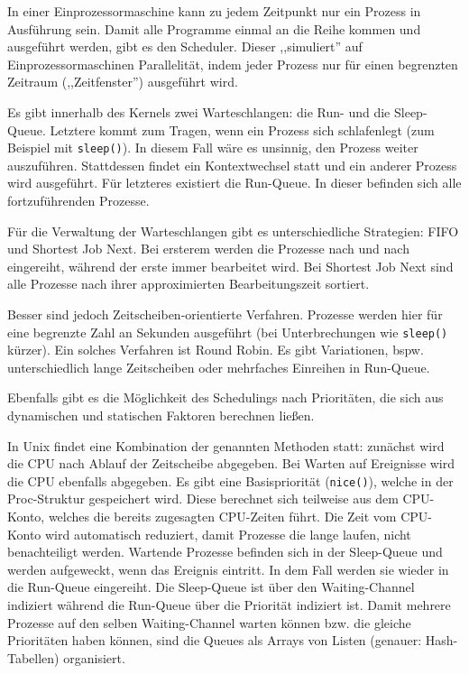 \begin{answer}
  In einer Einprozessormaschine kann zu jedem Zeitpunkt nur ein Prozess in Ausführung sein.
  Damit alle Programme einmal an die Reihe kommen und ausgeführt werden, gibt es den Scheduler.
  Dieser ,,simuliert'' auf Einprozessormaschinen Parallelität, indem jeder Prozess nur für
  einen begrenzten Zeitraum (,,Zeitfenster'') ausgeführt wird.

  Es gibt innerhalb des Kernels zwei Warteschlangen: die Run- und die Sleep-Queue.
  Letztere kommt zum Tragen, wenn ein Prozess sich schlafenlegt (zum Beispiel mit \texttt{sleep()}).
  In diesem Fall wäre es unsinnig, den Prozess weiter auszuführen. Stattdessen findet ein Kontextwechsel
  statt und ein anderer Prozess wird ausgeführt. Für letzteres existiert die Run-Queue. In dieser befinden
  sich alle fortzuführenden Prozesse.

  Für die Verwaltung der Warteschlangen gibt es unterschiedliche Strategien: FIFO und Shortest Job Next.
  Bei ersterem werden die Prozesse nach und nach eingereiht, während der erste immer bearbeitet wird.
  Bei Shortest Job Next sind alle Prozesse nach ihrer approximierten Bearbeitungszeit sortiert.

  Besser sind jedoch Zeitscheiben-orientierte Verfahren. Prozesse werden hier für eine begrenzte
  Zahl an Sekunden ausgeführt (bei Unterbrechungen wie \texttt{sleep()} kürzer). Ein solches Verfahren ist Round Robin.
  Es gibt Variationen, bspw. unterschiedlich lange Zeitscheiben oder mehrfaches Einreihen in Run-Queue.

  Ebenfalls gibt es die Möglichkeit des Schedulings nach Prioritäten, die sich aus dynamischen und statischen
  Faktoren berechnen ließen.
\end{answer}

\begin{answer}
  In Unix findet eine Kombination der genannten Methoden statt: zunächst wird die CPU nach Ablauf der Zeitscheibe abgegeben. Bei Warten auf Ereignisse wird die CPU ebenfalls abgegeben. Es gibt eine Basispriorität (\texttt{nice()}), welche in der Proc-Struktur gespeichert wird.
  Diese berechnet sich teilweise aus dem CPU-Konto, welches die bereits zugesagten CPU-Zeiten führt.
  Die Zeit vom CPU-Konto wird automatisch reduziert, damit Prozesse die lange laufen, nicht benachteiligt werden.
  Wartende Prozesse befinden sich in der Sleep-Queue und werden aufgeweckt, wenn das Ereignis eintritt. In dem Fall werden sie wieder in die Run-Queue eingereiht.
  Die Sleep-Queue ist über den Waiting-Channel indiziert während die Run-Queue über die Priorität indiziert ist.
  Damit mehrere Prozesse auf den selben Waiting-Channel warten können bzw. die gleiche Prioritäten haben können,
  sind die Queues als Arrays von Listen (genauer: Hash-Tabellen) organisiert.
\end{answer}

